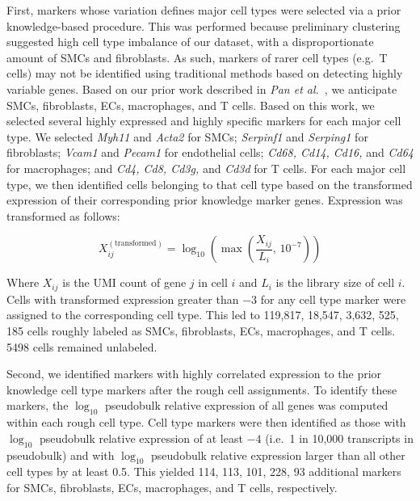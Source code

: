 \documentclass[12pt]{article}
\begin{document}
First, markers whose variation defines major cell types were selected via a prior knowledge-based
procedure. This was performed because preliminary clustering suggested high cell type imbalance of
our dataset, with a disproportionate amount of SMCs and fibroblasts. As such, markers of rarer cell
types (e.g.\ T cells) may not be identified using traditional methods based on detecting highly
variable genes. Based on our prior work described in \textit{Pan et al.}~\cite{ref35}, we anticipate
SMCs, fibroblasts, ECs, macrophages, and T cells. Based on this work, we selected several highly
expressed and highly specific markers for each major cell type. We selected \textit{Myh11} and
\textit{Acta2} for SMCs; \textit{Serpinf1} and \textit{Serping1} for fibroblasts; \textit{Vcam1} and
\textit{Pecam1} for endothelial cells; \textit{Cd68, Cd14, Cd16,} and \textit{Cd64} for macrophages;
and \textit{Cd4, Cd8, Cd3g,} and \textit{Cd3d} for T cells. For each major cell type, we then
identified cells belonging to that cell type based on the transformed expression of their
corresponding prior knowledge marker genes. Expression was transformed as follows:

\begin{equation}
X_{ij}^{(\text{transformed})} = \log_{10}\!\left( \max\!\left( \frac{X_{ij}}{L_{i}},\, 10^{-7} \right) \right)
\end{equation}

Where $X_{ij}$ is the UMI count of gene $j$ in cell $i$ and $L_{i}$ is the library size of cell $i$.
Cells with transformed expression greater than $-3$ for any cell type marker were assigned to the
corresponding cell type. This led to 119,817, 18,547, 3,632, 525, 185 cells roughly labeled as SMCs,
fibroblasts, ECs, macrophages, and T cells. 5498 cells remained unlabeled.

Second, we identified markers with highly correlated expression to the prior knowledge cell type
markers after the rough cell assignments. To identify these markers, the $\log_{10}$ pseudobulk
relative expression of all genes was computed within each rough cell type. Cell type markers were
then identified as those with $\log_{10}$ pseudobulk relative expression of at least $-4$ (i.e.\ 1
in 10,000 transcripts in pseudobulk) and with $\log_{10}$ pseudobulk relative expression larger than
all other cell types by at least 0.5. This yielded 114, 113, 101, 228, 93 additional markers for
SMCs, fibroblasts, ECs, macrophages, and T cells, respectively.
\end{document}
